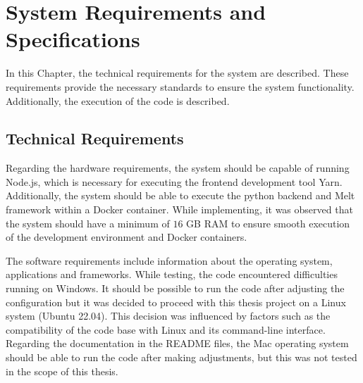 \documentclass[../MasterThesis.tex]{subfiles}
\begin{document}
	
	
	

%
%
%
%
%
%
%
%
\newpage
\section{System Requirements and Specifications} \label{section:systemrequirementsandspecifications}




In this Chapter, the technical requirements for the system are described. These requirements provide the necessary standards to ensure the system functionality. Additionally, the execution of the code is described.




\subsection{Technical Requirements} \label{subsection:technicalrequirements}



Regarding the hardware requirements, the system should be capable of running Node.js, which is necessary for executing the frontend development tool Yarn. Additionally, the system should be able to execute the python backend and Melt framework within a Docker container.
While implementing, it was observed that the system should have a minimum of $16$ GB RAM to ensure smooth execution of the development environment and Docker containers.



The software requirements include information about the operating system, applications and frameworks.
While testing, the code encountered difficulties running on Windows. It should be possible to run the code after adjusting the configuration but it was decided to proceed with this thesis project on a Linux system (Ubuntu 22.04). This decision was influenced by factors such as the compatibility of the code base with Linux and its command-line interface.
Regarding the documentation in the README files, the Mac operating system should be able to run the code after making adjustments, but this was not tested in the scope of this thesis.
\end{document}
